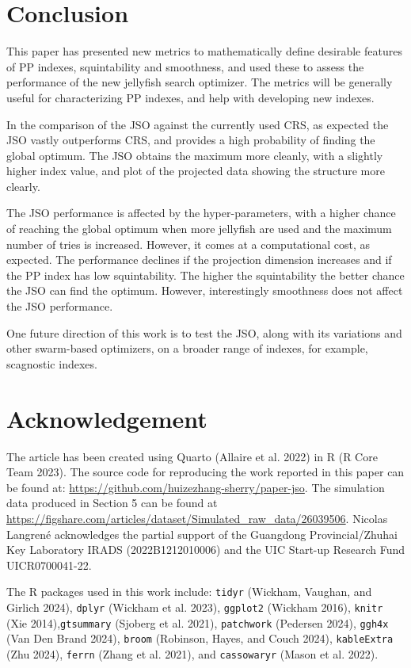 \documentclass[
  12pt,
]{interact}
\theoremstyle{plain}
\begin{document}
\section{Conclusion}\label{sec-conclusion}

This paper has presented new metrics to mathematically define desirable
features of PP indexes, squintability and smoothness, and used these to
assess the performance of the new jellyfish search optimizer. The
metrics will be generally useful for characterizing PP indexes, and help
with developing new indexes.

In the comparison of the JSO against the currently used CRS, as expected
the JSO vastly outperforms CRS, and provides a high probability of
finding the global optimum. The JSO obtains the maximum more cleanly,
with a slightly higher index value, and plot of the projected data
showing the structure more clearly.

The JSO performance is affected by the hyper-parameters, with a higher
chance of reaching the global optimum when more jellyfish are used and
the maximum number of tries is increased. However, it comes at a
computational cost, as expected. The performance declines if the
projection dimension increases and if the PP index has low
squintability. The higher the squintability the better chance the JSO
can find the optimum. However, interestingly smoothness does not affect
the JSO performance.

One future direction of this work is to test the JSO, along with its
variations and other swarm-based optimizers, on a broader range of
indexes, for example, scagnostic indexes.

\section{Acknowledgement}\label{acknowledgement}

The article has been created using Quarto (Allaire et al. 2022) in R (R
Core Team 2023). The source code for reproducing the work reported in
this paper can be found at:
\url{https://github.com/huizezhang-sherry/paper-jso}. The simulation
data produced in Section 5 can be found at
\url{https://figshare.com/articles/dataset/Simulated_raw_data/26039506}.
Nicolas Langrené acknowledges the partial support of the Guangdong
Provincial/Zhuhai Key Laboratory IRADS (2022B1212010006) and the UIC
Start-up Research Fund UICR0700041-22.

The R packages used in this work include: \texttt{tidyr} (Wickham,
Vaughan, and Girlich 2024), \texttt{dplyr} (Wickham et al. 2023),
\texttt{ggplot2} (Wickham 2016), \texttt{knitr} (Xie
2014),\texttt{gtsummary} (Sjoberg et al. 2021), \texttt{patchwork}
(Pedersen 2024), \texttt{ggh4x} (Van Den Brand 2024), \texttt{broom}
(Robinson, Hayes, and Couch 2024), \texttt{kableExtra} (Zhu 2024),
\texttt{ferrn} (Zhang et al. 2021), and \texttt{cassowaryr} (Mason et
al. 2022).
\end{document}
